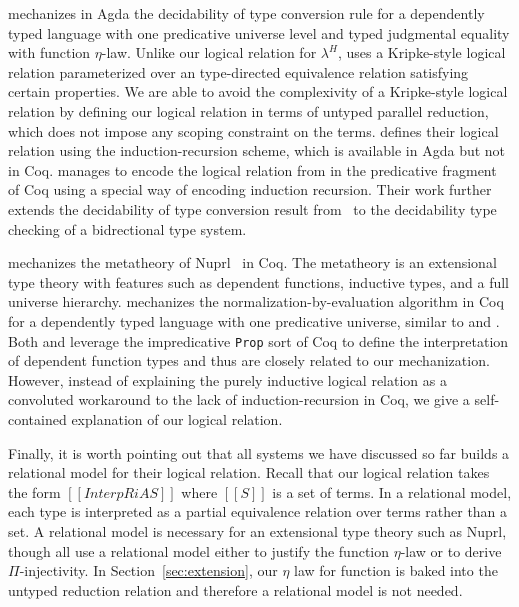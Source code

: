 \documentclass[acmsmall]{acmart}
\newcommand{\lang}{$\lambda^H$\xspace}
\begin{document}
\citet{decagda} mechanizes in Agda the decidability of type
conversion rule for a dependently typed language with one predicative
universe level and typed judgmental equality with function
$\eta$-law. Unlike our logical relation for \lang{}, \citet{decagda}
uses a Kripke-style logical relation parameterized over an
type-directed equivalence relation satisfying certain properties. We
are able to avoid the complexivity of a Kripke-style logical relation
by defining our logical relation in terms of untyped parallel
reduction, which does not impose any scoping constraint on the
terms. \citet{decagda} defines their logical relation using the
induction-recursion scheme, which is available in Agda but not in Coq.
\citet{martin-lof-a-la-coq} manages to encode the logical relation
from \citet{decagda} in the predicative fragment of Coq using a
special way of encoding induction recursion. Their work further
extends the decidability of type conversion result from~\citet{decagda} to the decidability
type checking of a bidrectional type system.

\citet{anand2014towards} mechanizes the metatheory of
Nuprl~\citep{constable1986implementing} in Coq. The metatheory is an
extensional type theory with features such as dependent functions,
inductive types, and a full universe hierarchy. \citet{nbeincoq}
mechanizes the normalization-by-evaluation algorithm in Coq for a
dependently typed language with one predicative universe, similar to
\citet{decagda} and \citet{martin-lof-a-la-coq}. Both
\citet{anand2014towards} and \citet{nbeincoq} leverage the
impredicative \texttt{Prop} sort of Coq to define the interpretation
of dependent function types and thus are closely related to our
mechanization. However, instead of explaining the purely inductive
logical relation as a convoluted workaround to the lack of
induction-recursion in Coq, we give a self-contained explanation of
our logical relation.

Finally, it is worth pointing out that all systems we have discussed
so far builds a relational model for their logical relation. Recall
that our logical relation takes the form $[[InterpR i A S]]$ where
$[[S]]$ is a set of terms. In a relational model, each type is
interpreted as a partial equivalence relation over terms rather than a
set. A relational model is necessary for an extensional type theory
such as Nuprl, though \citet{nbeincoq,decagda,martin-lof-a-la-coq} all
use a relational model either to justify the function $\eta$-law or to
derive $\Pi$-injectivity. In Section~\ref{sec:extension}, our $\eta$
law for function is baked into the untyped reduction
relation and therefore a relational model is not needed.
\end{document}
